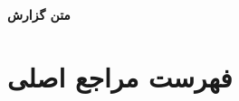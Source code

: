 \documentclass[12pt,a4paper]{article}
\newcommand{\نیمفاصله}{\halfspace}
\renewcommand{\ }{\halfspace}
\newcommand{\renderref}[1] { \begingroup \let\clearpage\relax  \endgroup }
\newcommand{\فوتنت}[1]{\footnote{\lr{#1}}}
\begin{document}
%
\begin{center}\LARGE\textbf{
متن گزارش
}\vspace{-2em}\end{center}

\vspace{-1em}

\vspace{-3em}

\vspace{-2em}

\vspace{-2em}



\newpage
\section{فهرست مراجع اصلی}
\renderref{reference}
\end{document}

